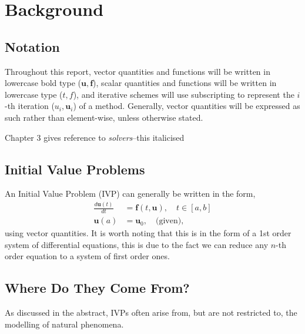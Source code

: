 \documentclass[12pt, twoside]{report}
\theoremstyle{plain}
\theoremstyle{definition}
\theoremstyle{definition}
\begin{document}

\chapter{Background}
    
    \section{Notation}
    \label{1_notation}
        Throughout this report, vector quantities and functions will be written
        in lowercase bold type ($\mathbf{u}, \mathbf{f}$), scalar quantities 
        and functions will be written in lowercase type ($t, f$), and iterative
        schemes will use subscripting to represent the $i$-th iteration 
        ($u_{i}, \mathbf{u}_i$) of a method. Generally, vector quantities will
        be expressed as such rather than element-wise, unless otherwise stated.

        Chapter 3 gives reference to \textit{solvers}--this italicised  


    \section{Initial Value Problems}
    \label{1_ivp}
        An Initial Value Problem (IVP) can generally be written in the form,
        \begin{equation}
        \label{eq:ivp}
            \begin{split}
                \frac{d \mathbf{u}(t)}{dt}& = \mathbf{f}(t, \mathbf{u}), 
                \quad t \in [a, b]\\
                \mathbf{u}(a)& = \mathbf{u}_0, \quad \text{(given)},
            \end{split}
        \end{equation}
        using vector quantities. It is worth noting that this is in the form of
        a 1st order system of differential equations, this is due to the fact 
        we can reduce any $n$-th order equation to a system of first order ones.


    \section{Where Do They Come From?}
    \label{1_origins}
        As discussed in the abstract, IVPs often arise from, but are not
        restricted to, the modelling of natural phenomena. 
\end{document}
